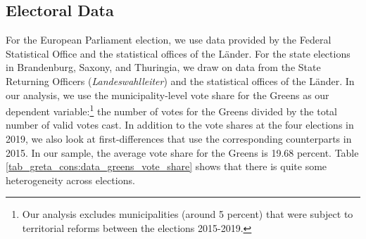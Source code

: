 \subsection{Electoral Data}
For the European Parliament election, we use data provided by the Federal Statistical Office and the statistical offices of the Länder. For the state elections in Brandenburg, Saxony, and Thuringia, we draw on data from the State Returning Officers (\textit{Landeswahlleiter}) and the statistical offices of the Länder. In our analysis, we use the municipality-level vote share for the Greens as our dependent variable:\footnote{Our analysis excludes municipalities (around 5 percent) that were subject to territorial reforms between the elections 2015-2019.} the number of votes for the Greens divided by the total number of valid votes cast. In addition to the vote shares at the four elections in 2019, we also look at first-differences that use the corresponding counterparts in 2015. In our sample, the average vote share for the Greens is 19.68 percent. Table \ref{tab_greta_cons:data_greens_vote_share} shows that there is quite some heterogeneity across elections.




